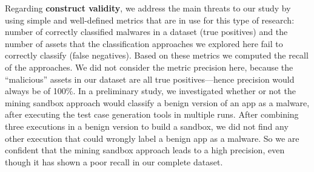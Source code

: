 Regarding {\bf construct validity}, we address the main threats
to our study by using simple and well-defined metrics that are
in use for this type of research: number of correctly classified
malwares in a dataset (true positives) and the number of assets that the
classification approaches we explored here fail to
correctly classify (false negatives). Based on these metrics we computed
the recall of the approaches. We did not consider the
metric precision here, because the ``malicious'' assets in our
dataset are all true positives---hence precision would
always be of 100\%. In a preliminary study, we
investigated whether or not the mining sandbox approach
would classify a benign version of an app as a malware,
after executing the test case generation tools in multiple
runs. After combining three executions in a benign version to
build a sandbox, we did not find any other execution that
could wrongly label a benign app as a malware. So we are
confident that the mining sandbox approach leads to a
high precision, even though it has shown a poor recall
in our complete dataset. 

